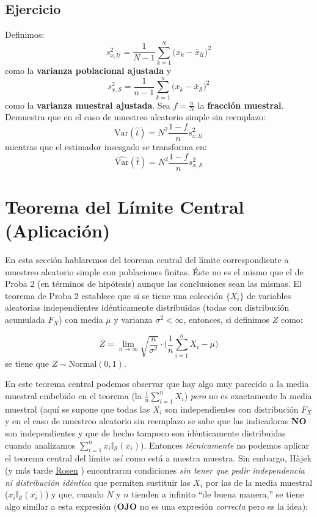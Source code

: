 \documentclass[
]{book}
\begin{document}
\hypertarget{ejercicio-6}{%
\subsection{Ejercicio}\label{ejercicio-6}}

Definimos:
\[
s_{x,\mathcal{U}}^2 = \dfrac{1}{N-1} \sum\limits_{k = 1}^N \big( x_k - \bar{x}_{\mathcal{U}})^2
\]
como la \textbf{varianza poblacional ajustada} y
\[
s_{x,\mathcal{S}}^2 = \dfrac{1}{n-1} \sum\limits_{k = 1}^n \big( x_k - \bar{x}_{\mathcal{S}})^2
\]
como la \textbf{varianza muestral ajustada}. Sea \(f = \frac{n}{N}\) la \textbf{fracción muestral}. Demuestra que en el caso de muestreo aleatorio simple sin reemplazo:
\[
\textrm{Var}(\hat{t}) = N^2\dfrac{1-f}{n} s^2_{x,\mathcal{U}}
\]
mientras que el estimador insesgado se transforma en:
\[
\widehat{\textrm{Var}}(\hat{t}) = N^2\dfrac{1-f}{n} s^2_{x,\mathcal{S}}
\]

\hypertarget{teorema-del-luxedmite-central-aplicaciuxf3n}{%
\section{Teorema del Límite Central (Aplicación)}\label{teorema-del-luxedmite-central-aplicaciuxf3n}}

En esta sección hablaremos del teorema central del límite correspondiente a muestreo aleatorio simple con poblaciones finitas. Éste no es el mismo que el de Proba 2 (en términos de hipótesis) aunque las conclusiones sean las mismas. El teorema de Proba 2 establece que si se tiene una colección \(\{ X_i \}\) de variables aleatorias independientes idénticamente distribuidas (todas con distribución acumulada \(F_X\)) con media \(\mu\) y varianza \(\sigma^2 < \infty\), entonces, si definimos \(Z\) como:

\[
Z =\lim_{n \to \infty} \sqrt{\dfrac{n}{\sigma^2}} \cdot  \Big( \frac{1}{n}\sum_{i = 1}^n X_i - \mu\Big)
\]
se tiene que \(Z \sim \textrm{Normal}(0,1)\).

En este teorema central podemos observar que hay algo muy parecido a la media muestral embebido en el teorema (la \(\frac{1}{n}\sum_{i = 1}^n X_i\)) \emph{pero} no es exactamente la media muestral (aquí se supone que todas las \(X_i\) son independientes con distribución \(F_X\) y en el caso de muestreo aleatorio sin reemplazo se sabe que las indicadoras \textbf{NO} son independientes y que de hecho tampoco son idénticamente distribuidas cuando analizamos \(\sum_{i = 1}^{n} x_i \mathbb{I}_{\mathcal{S}}(x_i)\)). Entonces \emph{técnicamente} no podemos aplicar el teorema central del límite así como está a nuestra muestra. Sin embargo, Hàjek (y más tarde \href{https://projecteuclid.org/download/pdf_1/euclid.afm/1485893466}{Rosen} ) encontraron condiciones \emph{sin tener que pedir independencia ni distribución idéntica} que permiten sustituir las \(X_i\) por las de la media muestral (\(x_i \mathbb{I}_{\mathcal{S}}(x_i)\)) y que, cuando \(N\) y \(n\) tienden a infinito ``de buena manera,'' se tiene algo similar a esta expresión (\textbf{OJO} no es una expresión \emph{correcta} pero es la idea):
\end{document}
